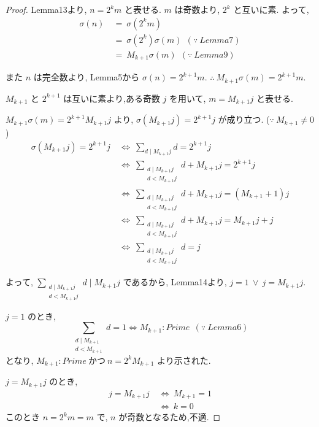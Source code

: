 \begin{proof}
Lemma13より, \(n = 2^km\) と表せる. \(m\) は奇数より, \(2^k\) と互いに素.
よって,
\begin{align*}
  \sigma(n) ~&=~ \sigma(2^km)\\
            ~&=~ \sigma(2^k)\sigma(m)~~(\because~Lemma7)\\
            ~&=~ M_{k+1}\sigma(m)~~(\because~Lemma9)
\end{align*}

また \(n\) は完全数より, Lemma5から \(\sigma(n) = 2^{k+1}m\). \(\therefore~ M_{k+1}\sigma(m) = 2^{k+1}m\).

\(M_{k+1}\) と \(2^{k+1}\) は互いに素より,ある奇数 \(j\) を用いて, \(m = M_{k+1}j\) と表せる.

\(M_{k+1} \sigma(m) = 2^{k+1} M_{k+1}j\) より, \(\sigma(M_{k+1}j) = 2^{k+1}j\) が成り立つ. (\(\because~M_{k+1} \neq 0\))
\begin{align*}
  \sigma(M_{k+1}j) = 2^{k+1}j ~&\Leftrightarrow~ \sum_{d \mid M_{k+1}j} d = 2^{k+1}j\\
                              ~&\Leftrightarrow~ \sum_{\substack{d \mid M_{k+1}j\\ d < M_{k+1}j}} d + M_{k+1}j = 2^{k+1}j\\
                              ~&\Leftrightarrow~ \sum_{\substack{d \mid M_{k+1}j\\ d < M_{k+1}j}} d + M_{k+1}j = (M_{k+1}+1)j\\
                              ~&\Leftrightarrow~ \sum_{\substack{d \mid M_{k+1}j\\ d < M_{k+1}j}} d + M_{k+1}j = M_{k+1}j + j\\
                              ~&\Leftrightarrow~ \sum_{\substack{d \mid M_{k+1}j\\ d < M_{k+1}j}} d = j
\end{align*}

よって, \(\sum_{\substack{d \mid M_{k+1}j\\ d < M_{k+1}j}} d \mid M_{k+1}j\) であるから, Lemma14より, \(j = 1 ~\vee~ j = M_{k+1}j\).

\(j = 1\) のとき,
\[
\sum_{\substack{d \mid M_{k+1}\\ d < M_{k+1}}} d = 1 \Leftrightarrow M_{k+1} : Prime~~(\because~Lemma6)
\]
となり, \(M_{k+1} : Prime ~\text{かつ} ~n = 2^kM_{k+1}\) より示された.

\(j = M_{k+1}j\) のとき,
\begin{align*}
  j = M_{k+1}j ~&\Leftrightarrow~ M_{k+1} = 1\\
               ~&\Leftrightarrow~ k = 0
\end{align*}
このとき \(n = 2^km = m\) で, \(n\) が奇数となるため,不適.
\end{proof}


